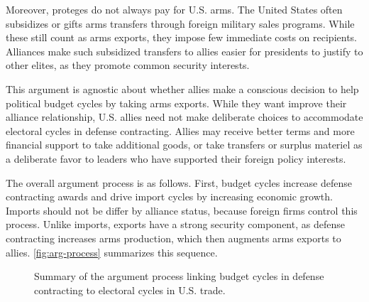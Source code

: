 \documentclass[12pt]{article}
\begin{document}
Moreover, proteges do not always pay for U.S. arms.
The United States often subsidizes or gifts arms transfers through foreign military sales programs. 
While these still count as arms exports, they impose few immediate costs on recipients.
Alliances make such subsidized transfers to allies easier for presidents to justify to other elites, as they promote common security interests. 


This argument is agnostic about whether allies make a conscious decision to help political budget cycles by taking arms exports.
While they want improve their alliance relationship, U.S. allies need not make deliberate choices to accommodate electoral cycles in defense contracting.
Allies may receive better terms and more financial support to take additional goods, or take transfers or surplus materiel as a deliberate favor to leaders who have supported their foreign policy interests. 


The overall argument process is as follows.
First, budget cycles increase defense contracting awards and drive import cycles by increasing economic growth. 
Imports should not be differ by alliance status, because foreign firms control this process.
Unlike imports, exports have a strong security component, as defense contracting increases arms production, which then augments arms exports to allies.
\autoref{fig:arg-process} summarizes this sequence.


\begin{figure}[htpb]
\caption{Summary of the argument process linking budget cycles in defense contracting to electoral cycles in U.S. trade.}
\label{fig:arg-process}
\end{figure}
\end{document}
